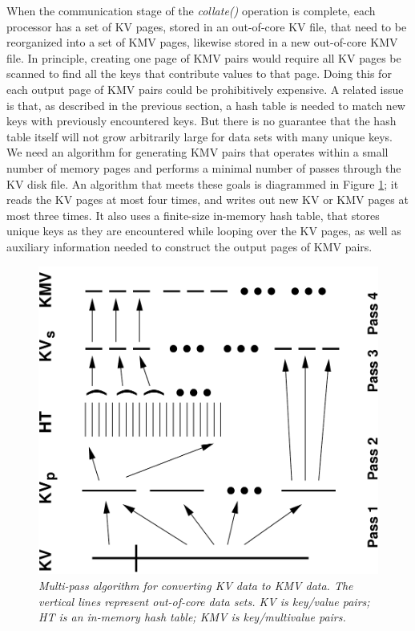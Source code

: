 When the communication stage of the {\it collate()} operation is
complete, each processor has a set of KV pages, stored in an
out-of-core KV file, that need to be reorganized into a set of KMV
pages, likewise stored in a new out-of-core KMV file.  In principle,
creating one page of KMV pairs would require all KV pages be scanned
to find all the keys that contribute values to that page.  Doing this
for each output page of KMV pairs could be prohibitively expensive.  A
related issue is that, as described in the previous section, a hash
table is needed to match new keys with previously encountered keys.
But there is no guarantee that the hash table itself will not grow
arbitrarily large for data sets with many unique keys.  We need an
algorithm for generating KMV pairs that operates within a small number
of memory pages and performs a minimal number of passes through the KV
disk file.  An algorithm that meets these goals is diagrammed in
Figure \ref{fig:collate}; it reads the KV pages at most four times,
and writes out new KV or KMV pages at most three times.  It also uses
a finite-size in-memory hash table, that stores unique keys as they
are encountered while looping over the KV pages, as well as auxiliary
information needed to construct the output pages of KMV pairs.

\begin{figure}
\includegraphics[width=\textwidth,angle=-90]{fig_collate2.pdf}
\caption{\it Multi-pass algorithm for converting KV data to KMV data.
The vertical lines represent out-of-core data sets.  KV is key/value
pairs; HT is an in-memory hash table; KMV is key/multivalue pairs.}
\label{fig:collate}
\end{figure}

